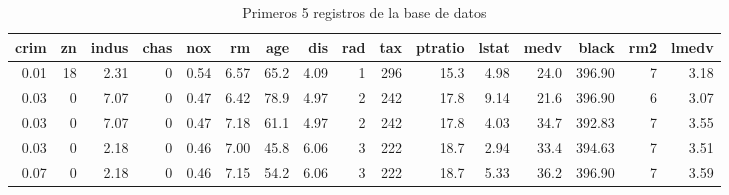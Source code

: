 \documentclass[12pt]{article}
\begin{document}
\setcounter{table}{0}
\begin{table}[htbp]
\centering
\footnotesize

\caption{\label{tab:unnamed-chunk-6}Primeros 5 registros de la base de datos}
\begin{tabular}[t]{rrrrrrrrrrrrrrrr}
\toprule
crim & zn & indus & chas & nox & rm & age & dis & rad & tax & ptratio & lstat & medv & black & rm2 & lmedv\\
\midrule
0.01 & 18 & 2.31 & 0 & 0.54 & 6.57 & 65.2 & 4.09 & 1 & 296 & 15.3 & 4.98 & 24.0 & 396.90 & 7 & 3.18\\
0.03 & 0 & 7.07 & 0 & 0.47 & 6.42 & 78.9 & 4.97 & 2 & 242 & 17.8 & 9.14 & 21.6 & 396.90 & 6 & 3.07\\
0.03 & 0 & 7.07 & 0 & 0.47 & 7.18 & 61.1 & 4.97 & 2 & 242 & 17.8 & 4.03 & 34.7 & 392.83 & 7 & 3.55\\
0.03 & 0 & 2.18 & 0 & 0.46 & 7.00 & 45.8 & 6.06 & 3 & 222 & 18.7 & 2.94 & 33.4 & 394.63 & 7 & 3.51\\
0.07 & 0 & 2.18 & 0 & 0.46 & 7.15 & 54.2 & 6.06 & 3 & 222 & 18.7 & 5.33 & 36.2 & 396.90 & 7 & 3.59\\
\bottomrule
\end{tabular}
\end{table}
\end{document}
